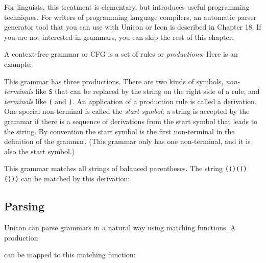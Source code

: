 For linguists, this treatment is elementary, but introduces useful
programming techniques. For writers of programming language compilers,
an automatic parser generator tool that you can use with Unicon or Icon
is described in Chapter 18. If you are not interested in grammars, you
can skip the rest of this chapter.

A context-free grammar or CFG is a set of
rules or \textit{productions}. Here is an example:


This grammar has three productions. There are two kinds of symbols,
\textit{non-terminals} like \texttt{S} that can be replaced by the
string on the right side of a rule, and \textit{terminals} like
\texttt{(} and \texttt{)}. An application of a production rule is called
a derivation. One special non-terminal is called the
\textit{start symbol}; a string is accepted by the grammar if there is a
sequence of derivations from the start symbol that leads to the string.
By convention the start symbol is the first non-terminal in the
definition of the grammar. (This grammar only has one non-terminal, and
it is also the start symbol.)

This grammar matches all strings of balanced parentheses. The string
\texttt{(()(()()))} can be matched by this derivation:


\subsection{Parsing}

Unicon can parse grammars in a natural way using matching
functions. A production


\noindent
can be mapped to this matching function:


